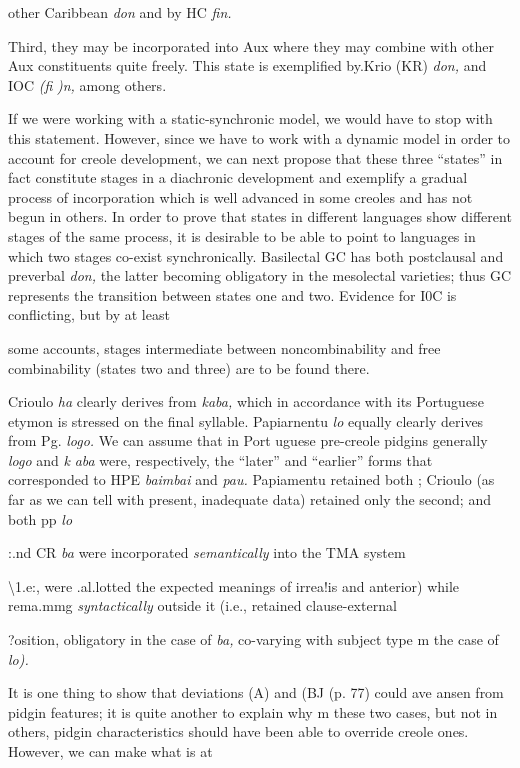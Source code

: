 other Caribbean \textit{don} and by HC \textit{fin.}

Third, they may be incorporated into Aux where they may combine with other Aux constituents quite freely. This state is exem\-plified by.Krio (KR) \textit{don,} and IOC \textit{(fi} \textit{)n,} among others.

If we were working with a static-synchronic model, we would have to stop with this statement. However, since we have to work with a dynamic model in order to account for creole development, we can next propose that these three ``states'' in fact constitute stages in a diachronic development and exemplify a gradual process of incorpora\-tion which is well advanced in some creoles and has not begun in others. In order to prove that states in different languages show differ\-ent stages of the same process, it is desirable to be able to point to languages in which two stages co-exist synchronically. Basilectal GC has both postclausal and preverbal \textit{don,} the latter becoming obligatory in the mesolectal varieties; thus GC represents the transition between states one and two. Evidence for I0C is conflicting, but by at least


some accounts, stages intermediate between noncombinability and free combinability (states two and three) are to be found there.

Crioulo \textit{ha} clearly derives from \textit{kaba,} which in accordance with its Portuguese etymon is stressed on the final syllable. Papiarnentu \textit{lo }equally clearly derives from Pg. \textit{logo.} We can assume that in Port uguese pre-creole pidgins generally \textit{logo} and \textit{k} \textit{aba} were, respectively, the ``later'' and ``earlier'' forms that corresponded to HPE \textit{baimbai }and \textit{pau.} Papiamentu retained both ; Crioulo (as far as we can tell with present, inadequate data) retained only the second; and both pp \textit{lo}

:.nd CR \textit{ba }were incorporated \textit{semantically }into the TMA system

{\textbackslash}1.e:, were .al.lotted the expected meanings of irrea!is and anterior) while rema.mmg \textit{syntactically }outside it (i.e., retained clause-external

?osition, obligatory in the case of \textit{ba, }co-varying with subject type m the case of \textit{lo).}

It is one thing to show that deviations (A) and (BJ (p. 77) could ave ansen from pidgin features; it is quite another to explain why m these two cases, but not in others, pidgin characteristics should have been able to override creole ones. However, we can make what is at

